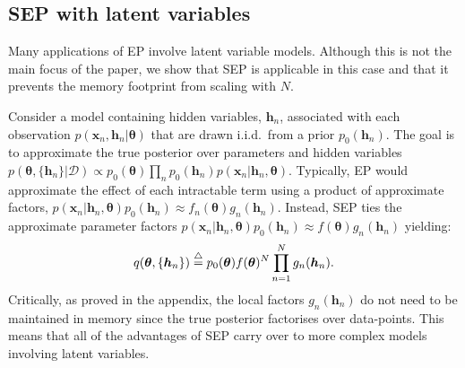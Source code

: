 
\subsection{SEP with latent variables}

Many applications of EP involve latent variable models. Although this is not the main focus of the paper, we show that SEP is applicable in this case and that it prevents the memory footprint from scaling with $N$. 

Consider a model containing hidden variables, $\bm{h}_n$, associated with each observation $p(\bm{x}_n, \bm{h}_n | \bm{\theta})$  that are drawn i.i.d.~from a prior $p_0(\bm{h}_n)$. The goal is to approximate the true posterior over parameters and hidden variables $p(\bm{\theta}, \{ \bm{h}_n\} | \mathcal{D}) \propto p_0(\bm{\theta}) \prod_n p_0(\bm{h}_n) p(\bm{x}_n | \bm{h}_n, \bm{\theta})$. 
%
Typically, EP would approximate the effect of each intractable term using a product of approximate factors, $p(\bm{x}_n | \bm{h}_n, \bm{\theta})p_0(\bm{h}_n)  \approx f_n(\bm{\theta}) g_n(\bm{h}_n) $. Instead, SEP ties the approximate parameter factors $p(\bm{x}_n | \bm{h}_n, \bm{\theta})p_0(\bm{h}_n)  \approx f(\bm{\theta}) g_n(\bm{h}_n) $ yielding:
\begin{equation}
q(\bm{\theta}, \{ \bm{h}_n\}) \buildrel\triangle\over = p_0(\bm{\theta}) f(\bm{\theta})^N \prod_{n=1}^N g_n(\bm{h}_n) .
\end{equation}
%
Critically, as proved in the appendix, the local factors $g_n(\bm{h}_n)$ do not need to be maintained in memory since the true posterior factorises over data-points. This means that all of the advantages of SEP carry over to more complex models involving latent variables.

%
%


